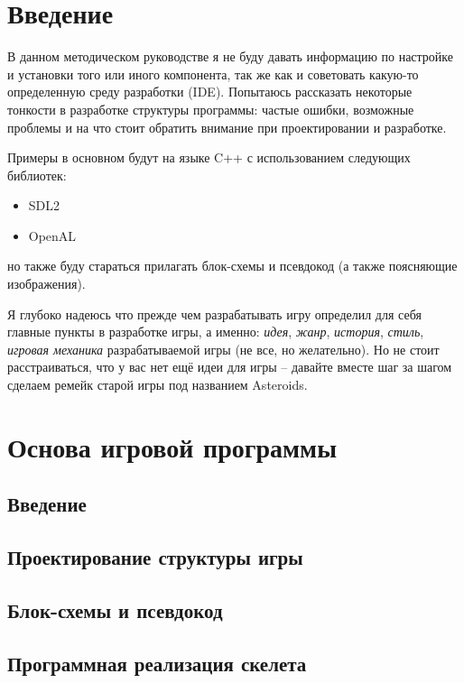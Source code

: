 \chapter{Введение} %

В данном методическом руководстве я не буду давать информацию по настройке и установки того или иного компонента, так же как и советовать какую-то 
определенную среду разработки (IDE). Попытаюсь рассказать некоторые тонкости в разработке структуры программы: частые ошибки, возможные проблемы и на что 
стоит обратить внимание при проектировании и разработке.

Примеры в основном будут на языке C++ с использованием следующих библиотек:
\begin{itemize}
    \item SDL2
    \item OpenAL
\end{itemize}
но также буду стараться прилагать блок-схемы и псевдокод (а также поясняющие изображения).

Я глубоко надеюсь что прежде чем разрабатывать игру определил для себя главные пункты в разработке игры, а именно: \emph{идея}, \emph{жанр}, \emph{история}, 
\emph{стиль}, \emph{игровая механика} разрабатываемой игры (не все, но желательно). Но не стоит расстраиваться, что у вас нет ещё идеи для игры -- давайте 
вместе шаг за шагом сделаем ремейк старой игры под названием Asteroids.

\chapter{Основа игровой программы}
\section{Введение}
\section{Проектирование структуры игры}
\section{Блок-схемы и псевдокод}
\section{Программная реализация скелета}
